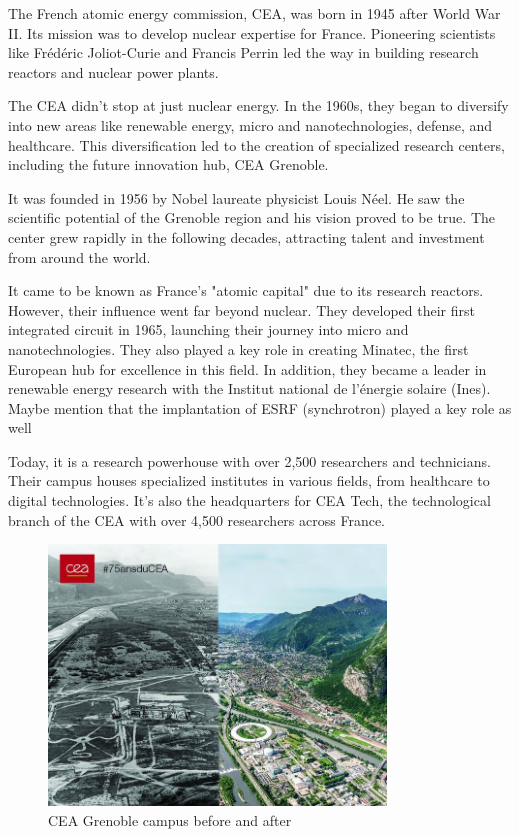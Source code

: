 \medskip

The French atomic energy commission, CEA, was born in 1945 after World War II. Its mission was to develop nuclear 
expertise for France. Pioneering scientists like Frédéric Joliot-Curie and Francis Perrin led the way in building 
research reactors and nuclear power plants.

\medskip

The CEA didn't stop at just nuclear energy. In the 1960s, they began to diversify into new areas like renewable energy,
 micro and nanotechnologies, defense, and healthcare. This diversification led to the creation of specialized research
 centers, including the future innovation hub, CEA Grenoble.

\medskip

It was founded in 1956 by Nobel laureate physicist Louis Néel. He saw the scientific potential of the Grenoble
region and his vision proved to be true. The center grew rapidly in the following decades, attracting talent and investment
from around the world.

\medskip

It came to be known as France's "atomic capital" due to its research reactors. However, their influence went far beyond
 nuclear. They developed their first integrated circuit in 1965, launching their journey into micro and nanotechnologies. 
 They also played a key role in creating Minatec, the first European hub for excellence in this field. In addition, they 
 became a leader in renewable energy research with the Institut national de l'énergie solaire (Ines).
 \color{red} Maybe mention that the implantation of ESRF (synchrotron) played a key role as well \color{black}

\medskip

Today, it is a research powerhouse with over 2,500 researchers and technicians. Their campus houses specialized
 institutes in various fields, from healthcare to digital technologies. It's also the headquarters for CEA Tech, the
 technological branch of the CEA with over 4,500 researchers across France.

\begin{figure}[h!]
    \centering
    \includegraphics[width=0.8\textwidth]{images/old_new.jpg}
    \caption{CEA Grenoble campus before and after}
\end{figure}

